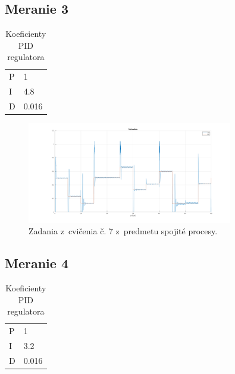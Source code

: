 \documentclass{article}
\begin{document}
\subsection{Meranie 3}
\label{sec:meranie3}

\begin{table}[!htbp]
	\caption{Koeficienty PID regulatora}
	\label{tab:t3}
	\begin{center}
		\begin{tabular}[c]{|l|l|}
			\hline
			P & 1 \\
			I & 4.8 \\
			D & 0.016 \\
			\hline
		\end{tabular}
	\end{center}
\end{table}

\begin{figure}[!htbp]
	\begin{center}
		\includegraphics[width=0.8\textwidth]{./include/m3.png}
	\end{center}
	\caption{Zadania z~cvičenia č. 7 z~predmetu spojité procesy.}
	\label{fig:meranie3}
\end{figure}

\subsection{Meranie 4}
\label{sec:meranie4}

\begin{table}[!htbp]
	\caption{Koeficienty PID regulatora}
	\label{tab:t4}
	\begin{center}
		\begin{tabular}[c]{|l|l|}
			\hline
			P & 1 \\
			I & 3.2 \\
			D & 0.016 \\
			\hline
		\end{tabular}
	\end{center}
\end{table}
\end{document}
